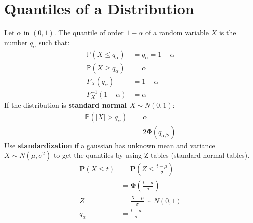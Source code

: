 \section{Quantiles of a Distribution}

Let $\alpha$ in $(0,1)$. The quantile of order $1 - \alpha$ of a random variable $X$ is the number $q_{\alpha}$ such that:\\
\begin{align*}
\displaystyle \mathbb{P}\left(X\leq q_{\alpha }\right)& = q_{\alpha } = 1-\alpha\\
\mathbb{P}(X \geq q_{\alpha })& = \alpha\\
F_X(q_{\alpha})& = 1 - \alpha\\
F^{-1}_{X}(1-\alpha)&= \alpha
\end{align*}
If the distribution is \textbf{standard normal} $X \sim N(0,1)$:\\
\begin{align*}
\mathbb{P}(|X| > q_{\alpha})& = \alpha\\
& = 2\mathbf{\Phi}(q_{\alpha/2})
\end{align*}
Use \textbf{standardization} if a gaussian has unknown mean and variance $X \sim N(\mu,\sigma^2)$ to get the quantiles by using Z-tables (standard normal tables).\\

\begin{align*}
\mathbf{P}\left(X\leq t\right)& = \displaystyle \mathbf{P}\left(Z\leq \frac{t-\mu}{\sigma}\right)\\
& = \mathbf{\Phi}\left(\frac{t-\mu}{\sigma}\right)\\
Z &= \frac{X-\mu}{\sigma} \sim N(0,1)\\
q_{\alpha }& = \frac{t-\mu}{\sigma}
\end{align*}